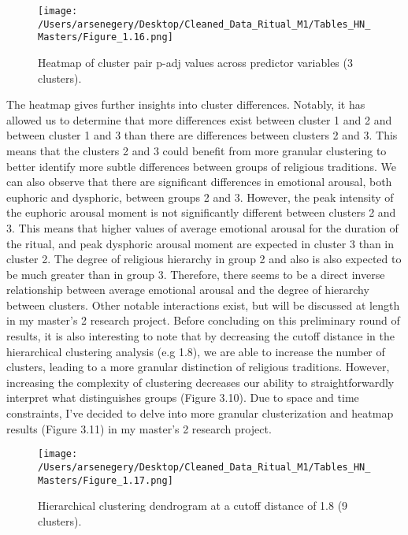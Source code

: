 \documentclass[12pt]{report}
\begin{document}
\begin{figure}[htbp]
	\centering
	\texttt{[image: /Users/arsenegery/Desktop/Cleaned\_Data\_Ritual\_M1/Tables\_HN\_Masters/Figure\_1.16.png]} %
	\caption{Heatmap of cluster pair p-adj values across predictor variables (3 clusters).} 
	\label{fig:table16}
\end{figure}

\noindent The heatmap gives further insights into cluster differences. Notably, it has allowed us to determine that more differences exist between cluster 1 and 2 and between cluster 1 and 3 than there are differences between clusters 2 and 3. This means that the clusters 2 and 3 could benefit from more granular clustering to better identify more subtle differences between groups of religious traditions. We can also observe that there are significant differences in emotional arousal, both euphoric and dysphoric, between groups 2 and 3. However, the peak intensity of the euphoric arousal moment is not significantly different between clusters 2 and 3. This means that higher values of average emotional arousal for the duration of the ritual, and peak dysphoric arousal moment are expected in cluster 3 than in cluster 2. The degree of religious hierarchy in group 2 and also is also expected to be much greater than in group 3. Therefore, there seems to be a direct inverse relationship between average emotional arousal and the degree of hierarchy between clusters. Other notable interactions exist, but will be discussed at length in my master’s 2 research project. Before concluding on this preliminary round of results, it is also interesting to note that by decreasing the cutoff distance in the hierarchical clustering analysis (e.g 1.8), we are able to increase the number of clusters, leading to a more granular distinction of religious traditions. However, increasing the complexity of clustering decreases our ability to straightforwardly interpret what distinguishes groups (Figure 3.10). Due to space and time constraints, I’ve decided to delve into more granular clusterization and heatmap results (Figure 3.11) in my master’s 2 research project.

\begin{figure}[htbp]
	\centering
	\texttt{[image: /Users/arsenegery/Desktop/Cleaned\_Data\_Ritual\_M1/Tables\_HN\_Masters/Figure\_1.17.png]} %
	\caption{Hierarchical clustering dendrogram at a cutoff distance of 1.8 (9 clusters).} 
	\label{fig:table17}
\end{figure}
\end{document}

